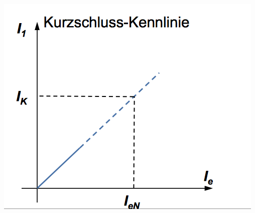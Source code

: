 \begin{minipage}{0.4 \linewidth}
\includegraphics[width = \linewidth]{./Pics/VL1011/kurzschlussk}
\end{minipage}
